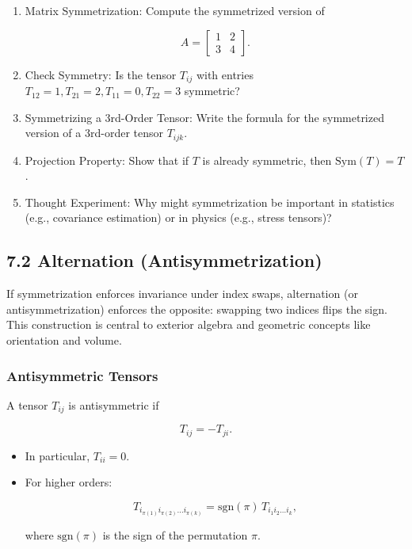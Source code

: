 \documentclass[
  letterpaper,
  DIV=11,
  numbers=noendperiod]{scrreprt}
\begin{document}
\begin{enumerate}
\def\labelenumi{\arabic{enumi}.}
\item
  Matrix Symmetrization: Compute the symmetrized version of

  \[
  A = \begin{bmatrix}1 & 2 \\ 3 & 4\end{bmatrix}.
  \]
\item
  Check Symmetry: Is the tensor \(T_{ij}\) with entries
  \(T_{12}=1, T_{21}=2, T_{11}=0, T_{22}=3\) symmetric?
\item
  Symmetrizing a 3rd-Order Tensor: Write the formula for the symmetrized
  version of a 3rd-order tensor \(T_{ijk}\).
\item
  Projection Property: Show that if \(T\) is already symmetric, then
  \(\mathrm{Sym}(T) = T\).
\item
  Thought Experiment: Why might symmetrization be important in
  statistics (e.g., covariance estimation) or in physics (e.g., stress
  tensors)?
\end{enumerate}

\subsection{7.2 Alternation
(Antisymmetrization)}\label{alternation-antisymmetrization}

If symmetrization enforces invariance under index swaps, alternation (or
antisymmetrization) enforces the opposite: swapping two indices flips
the sign. This construction is central to exterior algebra and geometric
concepts like orientation and volume.

\subsubsection{Antisymmetric Tensors}\label{antisymmetric-tensors}

A tensor \(T_{ij}\) is antisymmetric if

\[
T_{ij} = -T_{ji}.
\]

\begin{itemize}
\item
  In particular, \(T_{ii} = 0\).
\item
  For higher orders:

  \[
  T_{i_{\pi(1)} i_{\pi(2)} \dots i_{\pi(k)}} = \mathrm{sgn}(\pi) \, T_{i_1 i_2 \dots i_k},
  \]

  where \(\mathrm{sgn}(\pi)\) is the sign of the permutation \(\pi\).
\end{itemize}
\end{document}
